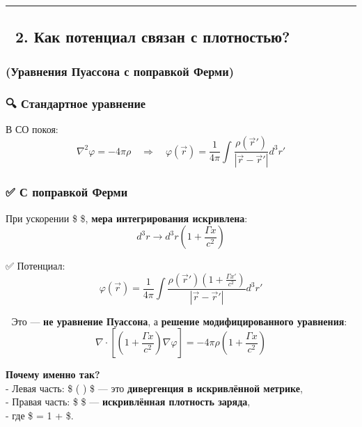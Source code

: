 \documentclass[11pt]{article}
\begin{document}
\begin{center}\rule{0.5\linewidth}{\linethickness}\end{center}

\subsection{🔹 2. Как потенциал связан с
плотностью?}\label{ux43aux430ux43a-ux43fux43eux442ux435ux43dux446ux438ux430ux43b-ux441ux432ux44fux437ux430ux43d-ux441-ux43fux43bux43eux442ux43dux43eux441ux442ux44cux44e}

\subsubsection{(Уравнения Пуассона с поправкой
Ферми)}\label{ux443ux440ux430ux432ux43dux435ux43dux438ux44f-ux43fux443ux430ux441ux441ux43eux43dux430-ux441-ux43fux43eux43fux440ux430ux432ux43aux43eux439-ux444ux435ux440ux43cux438}

\subsubsection{🔍 Стандартное
уравнение}\label{ux441ux442ux430ux43dux434ux430ux440ux442ux43dux43eux435-ux443ux440ux430ux432ux43dux435ux43dux438ux435}

В СО покоя: \[
\nabla^2 \varphi = -4\pi \rho
\quad \Rightarrow \quad
\varphi(\vec{r}) = \frac{1}{4\pi} \int \frac{\rho(\vec{r}')}{|\vec{r} - \vec{r}'|} d^3r'
\]

\subsubsection{✅ С поправкой
Ферми}\label{ux441-ux43fux43eux43fux440ux430ux432ux43aux43eux439-ux444ux435ux440ux43cux438}

При ускорении \$ \Gamma \$, \textbf{мера интегрирования искривлена}: \[
d^3r \to d^3r \left( 1 + \frac{\Gamma x}{c^2} \right)
\]

✅ Потенциал: \[
\boxed{
\varphi(\vec{r}) = \frac{1}{4\pi} \int \frac{\rho(\vec{r}') \left( 1 + \frac{\Gamma x'}{c^2} \right)}{|\vec{r} - \vec{r}'|} d^3r'
}
\]

📌 Это --- \textbf{не уравнение Пуассона}, а \textbf{решение
модифицированного уравнения}: \[
\boxed{
\nabla \cdot \left[ \left( 1 + \frac{\Gamma x}{c^2} \right) \nabla \varphi \right] = -4\pi \rho \left( 1 + \frac{\Gamma x}{c^2} \right)
}
\]

\textbf{Почему именно так?}\\
- Левая часть: \$ \nabla \cdot ( \nabla \varphi) \$ --- это
\textbf{дивергенция в искривлённой метрике},\\
- Правая часть: \$ \rho {} \$ --- \textbf{искривлённая
плотность заряда},\\
- где \$  = 1 +  \$.
\end{document}
